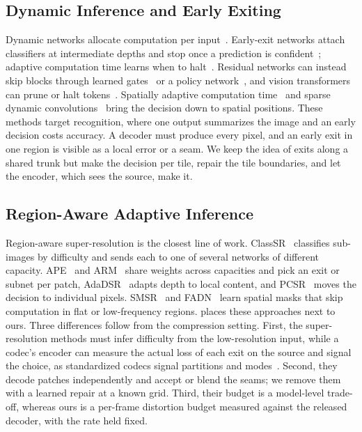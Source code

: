 \subsection{Dynamic Inference and Early Exiting}
\label{sec:rw_dynamic}

Dynamic networks allocate computation per input~\cite{han2022survey}.
Early-exit networks attach classifiers at intermediate depths and stop once a prediction is confident~\cite{teerapittayanon2016,huang2018msdnet}; adaptive computation time learns when to halt~\cite{graves2016act}.
Residual networks can instead skip blocks through learned gates~\cite{wang2018skipnet,veit2018} or a policy network~\cite{wu2018blockdrop}, and vision transformers can prune or halt tokens~\cite{rao2021dynamicvit,yin2022avit}.
Spatially adaptive computation time~\cite{figurnov2017sact} and sparse dynamic convolutions~\cite{verelst2020} bring the decision down to spatial positions.
These methods target recognition, where one output summarizes the image and an early decision costs accuracy.
A decoder must produce every pixel, and an early exit in one region is visible as a local error or a seam.
We keep the idea of exits along a shared trunk but make the decision per tile, repair the tile boundaries, and let the encoder, which sees the source, make it.

\subsection{Region-Aware Adaptive Inference}
\label{sec:rw_region}

Region-aware super-resolution is the closest line of work.
ClassSR~\cite{kong2021classsr} classifies sub-images by difficulty and sends each to one of several networks of different capacity.
APE~\cite{wang2022ape} and ARM~\cite{chen2022arm} share weights across capacities and pick an exit or subnet per patch, AdaDSR~\cite{liu2020adadsr} adapts depth to local content, and PCSR~\cite{jeong2024pcsr} moves the decision to individual pixels.
SMSR~\cite{wang2021smsr} and FADN~\cite{xie2021fadn} learn spatial masks that skip computation in flat or low-frequency regions.
 places these approaches next to ours.
Three differences follow from the compression setting.
First, the super-resolution methods must infer difficulty from the low-resolution input, while a codec's encoder can measure the actual loss of each exit on the source and signal the choice, as standardized codecs signal partitions and modes~\cite{sullivan2012hevc,bross2021vvc}.
Second, they decode patches independently and accept or blend the seams; we remove them with a learned repair at a known grid.
Third, their budget is a model-level trade-off, whereas ours is a per-frame distortion budget measured against the released decoder, with the rate held fixed.

